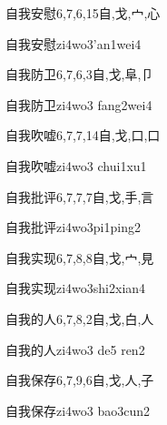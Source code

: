 \begin{Entry}{自我安慰}{6,7,6,15}{⾃,⼽,⼧,⼼}
  \begin{Phonetics}{自我安慰}{zi4wo3'an1wei4}
  \end{Phonetics}
\end{Entry}

\begin{Entry}{自我防卫}{6,7,6,3}{⾃,⼽,⾩,⼙}
  \begin{Phonetics}{自我防卫}{zi4wo3 fang2wei4}
  \end{Phonetics}
\end{Entry}

\begin{Entry}{自我吹嘘}{6,7,7,14}{⾃,⼽,⼝,⼝}
  \begin{Phonetics}{自我吹嘘}{zi4wo3 chui1xu1}
  \end{Phonetics}
\end{Entry}

\begin{Entry}{自我批评}{6,7,7,7}{⾃,⼽,⼿,⾔}
  \begin{Phonetics}{自我批评}{zi4wo3pi1ping2}
  \end{Phonetics}
\end{Entry}

\begin{Entry}{自我实现}{6,7,8,8}{⾃,⼽,⼧,⾒}
  \begin{Phonetics}{自我实现}{zi4wo3shi2xian4}
  \end{Phonetics}
\end{Entry}

\begin{Entry}{自我的人}{6,7,8,2}{⾃,⼽,⽩,⼈}
  \begin{Phonetics}{自我的人}{zi4wo3 de5 ren2}
  \end{Phonetics}
\end{Entry}

\begin{Entry}{自我保存}{6,7,9,6}{⾃,⼽,⼈,⼦}
  \begin{Phonetics}{自我保存}{zi4wo3 bao3cun2}
  \end{Phonetics}
\end{Entry}

